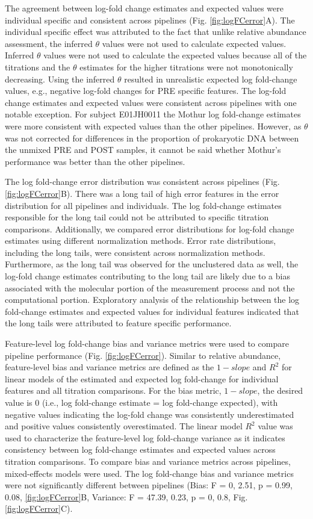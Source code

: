 \documentclass[linenumbers]{bmcart}
\begin{document}
The agreement between log-fold change estimates and expected values were
individual specific and consistent across pipelines (Fig.
\ref{fig:logFCerror}A). The individual specific effect was attributed to
the fact that unlike relative abundance assessment, the inferred
\(\theta\) values were not used to calculate expected values. Inferred
\(\theta\) values were not used to calculate the expected values because
all of the titrations and the \(\theta\) estimates for the higher
titrations were not monotonically decreasing.
Using the inferred \(\theta\) resulted in unrealistic expected log fold-change values, e.g.,
negative log-fold changes for PRE specific features. The log-fold change
estimates and expected values were consistent across pipelines with one
notable exception. For subject E01JH0011 the Mothur log fold-change estimates
were more consistent with expected values than the other pipelines.
However, as \(\theta\) was not corrected for differences in the
proportion of prokaryotic DNA between the unmixed PRE and POST samples,
it cannot be said whether Mothur's performance was better than the other
pipelines.

The log fold-change error distribution was consistent across pipelines
(Fig. \ref{fig:logFCerror}B). There was a long tail of high error
features in the error distribution for all pipelines and individuals.
The log fold-change estimates responsible for the long tail could not be
attributed to specific titration comparisons. Additionally, we compared
error distributions for log-fold change estimates using
different normalization methods. Error rate distributions, including the
long tails, were consistent across normalization methods. Furthermore,
as the long tail was observed for the unclustered data as well, the
log-fold change estimates contributing to the long tail are likely due
to a bias associated with the molecular portion of the
measurement process and not the computational portion. Exploratory
analysis of the relationship between the log fold-change estimates and
expected values for individual features indicated that the long tails
were attributed to feature specific performance.

Feature-level log fold-change bias and variance metrics were used to
compare pipeline performance (Fig. \ref{fig:logFCerror}). Similar to
relative abundance, feature-level bias and variance metrics are defined
as the \(1 - slope\) and \(R^2\) for linear models of the estimated and
expected log fold-change for individual features and all titration
comparisons. For the bias metric, \(1 - slope\), the desired value is 0
(i.e., log fold-change estimate = log fold-change expected), with
negative values indicating the log-fold change was consistently
underestimated and positive values consistently overestimated. The
linear model \(R^2\) value was used to characterize the feature-level
log fold-change variance as it indicates consistency between log
fold-change estimates and expected values across titration comparisons.
To compare bias and variance metrics across pipelines, mixed-effects
models were used. The log fold-change bias and variance metrics were not
significantly different between pipelines (Bias: F = 0, 2.51, p = 0.99,
0.08, \ref{fig:logFCerror}B, Variance: F = 47.39, 0.23, p = 0, 0.8, Fig.
\ref{fig:logFCerror}C).
\end{document}
